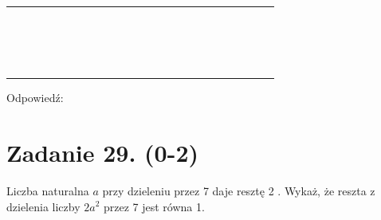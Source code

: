 \documentclass[10pt]{article}
\begin{document}
\begin{center}
\begin{tabular}{|c|c|c|c|c|c|c|c|c|c|c|c|c|c|c|c|c|c|c|c|c|c|c|c|}
\hline
 &  &  &  &  &  &  &  &  &  &  &  &  &  &  &  &  &  &  &  &  &  &  &  \\
\hline
 &  &  &  &  &  &  &  &  &  &  &  &  &  &  &  &  &  &  &  &  &  &  &  \\
\hline
 &  &  &  &  &  &  &  &  &  &  &  &  &  &  &  &  &  &  &  &  &  &  &  \\
\hline
 &  &  &  &  &  &  &  &  &  &  &  &  &  &  &  &  &  &  &  &  &  &  &  \\
\hline
 &  &  &  &  &  &  &  &  &  &  &  &  &  &  &  &  &  &  &  &  &  &  &  \\
\hline
 &  &  &  &  &  &  &  &  &  &  &  &  &  &  &  &  &  &  &  &  &  &  &  \\
\hline
 &  &  &  &  &  &  &  &  &  &  &  &  &  &  &  &  &  &  &  &  &  &  &  \\
\hline
 &  &  &  &  &  &  &  &  &  &  &  &  &  &  &  &  &  &  &  &  &  &  &  \\
\hline
 &  &  &  &  &  &  &  &  &  &  &  &  &  &  &  &  &  &  &  &  &  &  &  \\
\hline
 &  &  &  &  &  &  &  &  &  &  &  &  &  &  &  &  &  &  &  &  &  &  &  \\
\hline
 &  &  &  &  &  &  &  &  &  &  &  &  &  &  &  &  &  &  &  &  &  &  &  \\
\hline
 &  &  &  &  &  &  &  &  &  &  &  &  &  &  &  &  &  &  &  &  &  &  &  \\
\hline
 &  &  &  &  &  &  &  &  &  &  &  &  &  &  &  &  &  &  &  &  &  &  &  \\
\hline
 &  &  &  &  &  &  &  &  &  &  &  &  &  &  &  &  &  &  &  &  &  &  &  \\
\hline
 &  &  &  &  &  &  &  &  &  &  &  &  &  &  &  &  &  &  &  &  &  &  &  \\
\hline
 &  &  &  &  &  &  &  &  &  &  &  &  &  &  &  &  &  &  &  &  &  &  &  \\
\hline
 &  &  &  &  &  &  &  &  &  &  &  &  &  &  &  &  &  &  &  &  &  &  &  \\
\hline
 &  &  &  &  &  &  &  &  &  &  &  &  &  &  &  &  &  &  &  &  &  &  &  \\
\hline
\end{tabular}
\end{center}

Odpowiedź: \(\qquad\)

\section*{Zadanie 29. (0-2)}
Liczba naturalna \(a\) przy dzieleniu przez 7 daje resztę 2 . Wykaż, że reszta z dzielenia liczby \(2 a^{2}\) przez 7 jest równa 1.
\end{document}
